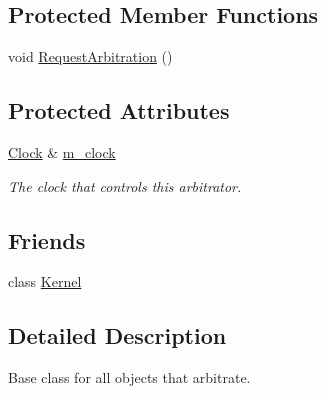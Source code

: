 \subsection*{Protected Member Functions}
\begin{DoxyCompactItemize}
\item 
void \hyperlink{class_simulator_1_1_arbitrator_a6fa047be0554f4edea1363e960835f29}{Request\+Arbitration} ()
\end{DoxyCompactItemize}
\subsection*{Protected Attributes}
\begin{DoxyCompactItemize}
\item 
\hyperlink{class_simulator_1_1_clock}{Clock} \& \hyperlink{class_simulator_1_1_arbitrator_ae81bdde0ba892172b8594a25dd2ef9cc}{m\+\_\+clock}
\begin{DoxyCompactList}\small\item\em The clock that controls this arbitrator. \end{DoxyCompactList}\end{DoxyCompactItemize}
\subsection*{Friends}
\begin{DoxyCompactItemize}
\item 
class \hyperlink{class_simulator_1_1_arbitrator_a3807a3ebd0e05ca8cb4d928025a943d2}{Kernel}
\end{DoxyCompactItemize}


\subsection{Detailed Description}
Base class for all objects that arbitrate. 

